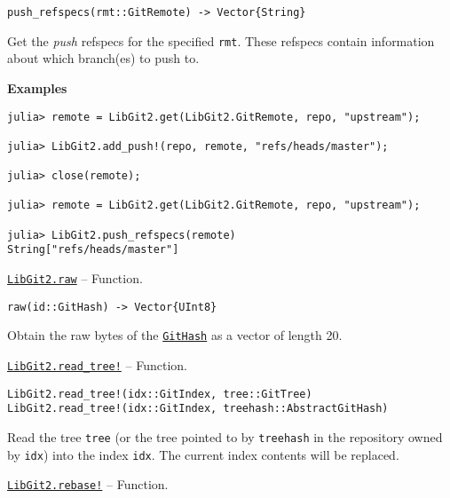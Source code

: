 \begin{adjustwidth}{2em}{0pt}


\begin{verbatim}
push_refspecs(rmt::GitRemote) -> Vector{String}
\end{verbatim}

Get the \emph{push} refspecs for the specified \texttt{rmt}. These refspecs contain information about which branch(es) to push to.

\textbf{Examples}


\begin{verbatim}
julia> remote = LibGit2.get(LibGit2.GitRemote, repo, "upstream");

julia> LibGit2.add_push!(repo, remote, "refs/heads/master");

julia> close(remote);

julia> remote = LibGit2.get(LibGit2.GitRemote, repo, "upstream");

julia> LibGit2.push_refspecs(remote)
String["refs/heads/master"]
\end{verbatim}



\end{adjustwidth}
\hypertarget{17280494735661401954}{} 
\hyperlink{17280494735661401954}{\texttt{LibGit2.raw}}  -- {Function.}

\begin{adjustwidth}{2em}{0pt}


\begin{verbatim}
raw(id::GitHash) -> Vector{UInt8}
\end{verbatim}

Obtain the raw bytes of the \hyperlink{202290709580230708}{\texttt{GitHash}} as a vector of length 20.



\end{adjustwidth}
\hypertarget{8133295290894494359}{} 
\hyperlink{8133295290894494359}{\texttt{LibGit2.read\_tree!}}  -- {Function.}

\begin{adjustwidth}{2em}{0pt}


\begin{verbatim}
LibGit2.read_tree!(idx::GitIndex, tree::GitTree)
LibGit2.read_tree!(idx::GitIndex, treehash::AbstractGitHash)
\end{verbatim}

Read the tree \texttt{tree} (or the tree pointed to by \texttt{treehash} in the repository owned by \texttt{idx}) into the index \texttt{idx}. The current index contents will be replaced.



\end{adjustwidth}
\hypertarget{14810332437858061232}{} 
\hyperlink{14810332437858061232}{\texttt{LibGit2.rebase!}}  -- {Function.}

